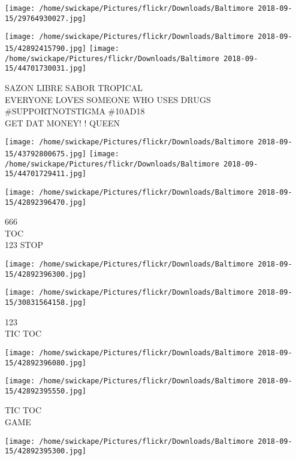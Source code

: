 \documentclass[10pt,letterpaper]{article}
\begin{document}
\texttt{[image: /home/swickape/Pictures/flickr/Downloads/Baltimore 2018-09-15/29764930027.jpg]}

\vspace{0.25in}
\texttt{[image: /home/swickape/Pictures/flickr/Downloads/Baltimore 2018-09-15/42892415790.jpg]}
\texttt{[image: /home/swickape/Pictures/flickr/Downloads/Baltimore 2018-09-15/44701730031.jpg]}

SAZON LIBRE SABOR TROPICAL\\
EVERYONE LOVES SOMEONE WHO USES DRUGS \#SUPPORTNOTSTIGMA \#10AD18\\
GET DAT MONEY! ! QUEEN\\
\pagebreak

\texttt{[image: /home/swickape/Pictures/flickr/Downloads/Baltimore 2018-09-15/43792800675.jpg]}
\texttt{[image: /home/swickape/Pictures/flickr/Downloads/Baltimore 2018-09-15/44701729411.jpg]}

\vspace{0.25in}
\texttt{[image: /home/swickape/Pictures/flickr/Downloads/Baltimore 2018-09-15/42892396470.jpg]}

666\\
TOC\\
123 STOP\\
\pagebreak

\texttt{[image: /home/swickape/Pictures/flickr/Downloads/Baltimore 2018-09-15/42892396300.jpg]}

\vspace{0.25in}
\texttt{[image: /home/swickape/Pictures/flickr/Downloads/Baltimore 2018-09-15/30831564158.jpg]}

123\\
TIC TOC\\
\pagebreak

\texttt{[image: /home/swickape/Pictures/flickr/Downloads/Baltimore 2018-09-15/42892396080.jpg]}

\vspace{0.25in}
\texttt{[image: /home/swickape/Pictures/flickr/Downloads/Baltimore 2018-09-15/42892395550.jpg]}

TIC TOC\\
GAME\\
\pagebreak

\texttt{[image: /home/swickape/Pictures/flickr/Downloads/Baltimore 2018-09-15/42892395300.jpg]}
\end{document}
